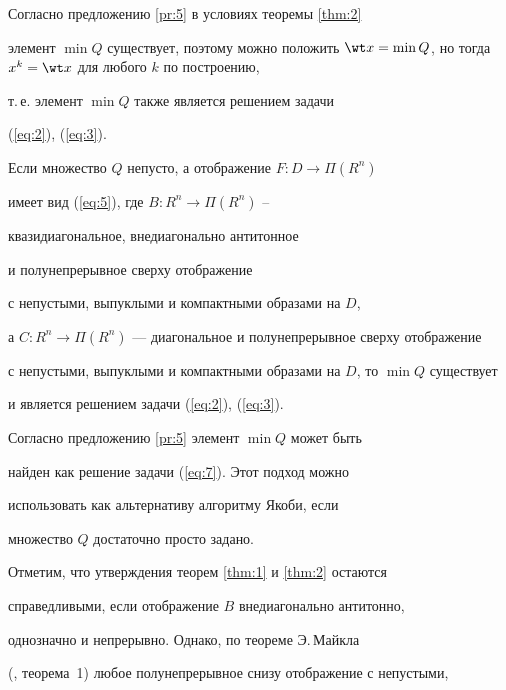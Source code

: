 Согласно предложению \ref{pr:5} в условиях теоремы \ref{thm:2}


элемент $\min Q$ существует, поэтому можно положить $\wt x =


\min Q$, но тогда $x^k=\wt x$ для любого $k$ по построению,


т.\,е. элемент $\min Q$ также является решением задачи


(\ref{eq:2}), (\ref{eq:3}).











\begin{cors}\label{cor:2}


Если множество  $Q$ непусто, а отображение $F: D \to \Pi (R^{n})$


имеет вид (\ref{eq:5}), где $B: R^n \to \Pi (R^n)$ --


квазидиагональное, внедиагонально антитонное


и полунепрерывное сверху отображение


с непустыми, выпуклыми и компактными образами на $D$,


а $C: R^n \to \Pi (R^n)$ --- диагональное и полунепрерывное сверху отображение


с непустыми, выпуклыми и компактными образами на $D$, то $\min Q$ существует


и является решением задачи (\ref{eq:2}), (\ref{eq:3}).


\end{cors}





Согласно предложению \ref{pr:5} элемент $\min Q$ может быть


найден как решение задачи (\ref{eq:7}). Этот подход можно


использовать как альтернативу алгоритму Якоби, если


множество  $Q$ достаточно просто задано.








Отметим, что утверждения теорем \ref{thm:1} и \ref{thm:2} остаются


справедливыми, если отображение $B$ внедиагонально антитонно,


однозначно и непрерывно. Однако, по теореме Э.\,Майкла


(\cite{Mic56}, теорема~1) любое полунепрерывное снизу отображение с непустыми,


